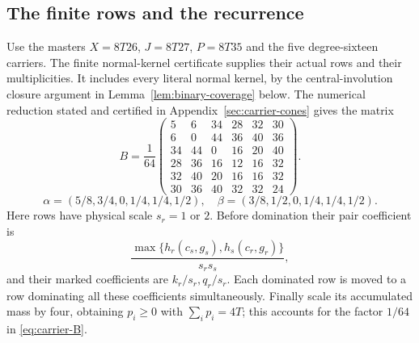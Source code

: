 \subsection{The finite rows and the recurrence}
Use the masters $X=8T26$, $J=8T27$, $P=8T35$ and the five degree-sixteen
carriers. The finite normal-kernel certificate supplies their actual
rows and their multiplicities. It includes every literal normal kernel,
by the central-involution closure argument in
Lemma~\ref{lem:binary-coverage} below. The numerical reduction stated
and certified in Appendix~\ref{sec:carrier-cones} gives the matrix
\begin{equation}\label{eq:carrier-B}
 B=\frac1{64}\begin{pmatrix}
 5&6&34&28&32&30\\6&0&44&36&40&36\\
 34&44&0&16&20&40\\28&36&16&12&16&32\\
 32&40&20&16&16&32\\30&36&40&32&32&24
 \end{pmatrix}.
\end{equation}
\[
 \alpha=(5/8,3/4,0,1/4,1/4,1/2),\quad
 \beta=(3/8,1/2,0,1/4,1/4,1/2).
\]
Here rows have physical scale $s_r=1$ or $2$. Before domination their
pair coefficient is
\[
 \frac{\max\{h_r(c_s,g_s),h_s(c_r,g_r)\}}{s_rs_s},
\]
and their marked coefficients are $k_r/s_r,q_r/s_r$. Each dominated row is moved to a
row dominating all these coefficients simultaneously. Finally scale
its accumulated mass by four, obtaining $p_i\geq0$ with
$\sum_i p_i=4T$; this accounts for the factor $1/64$ in
\eqref{eq:carrier-B}.

